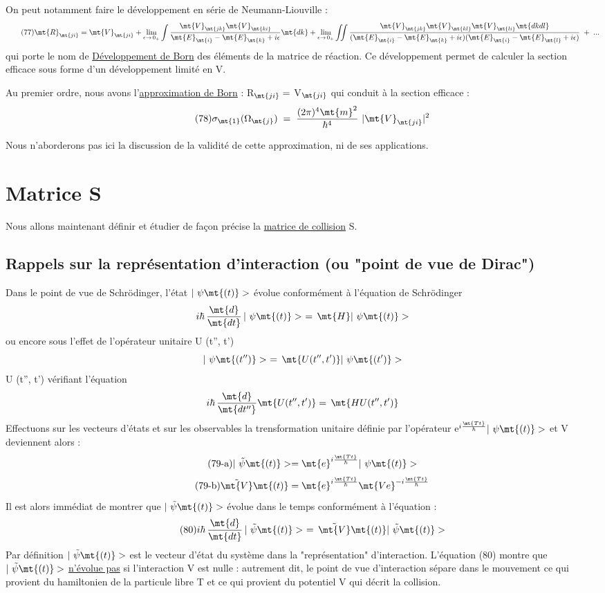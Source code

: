 On peut notamment faire le développement en série de Neumann-Liouville :
\[
\tag{77}\mt{R}_\mt{ji}=\mt{ V}_\mt{ji}+\lim_{\epsilon\to\,0_+}\int
\frac{\mt{V}_\mt{jk}\mt{ V}_\mt{ki}}{\mt{E}_\mt{i}-\mt{E}_\mt{k}+i\epsilon}\mt{ dk }+
\lim_{\epsilon\to\,0_+}\iint\frac{\mt{V}_\mt{jk}\mt{ V}_\mt{kl}\mt{ V}_\mt{li}\mt{ dk dl}}
{(\mt{E}_\mt{i}-\mt{E}_\mt{k}+i\epsilon)(\mt{E}_\mt{i}-\mt{E}_\mt{l}+i\epsilon)}\;+\;...
\]
qui porte le nom de \ul{Développement de Born} des éléments de la matrice de
réaction. Ce développement permet de calculer la section efficace sous
forme d'un développement limité en V.

Au premier ordre, nous avons l'\ul{approximation de Born} : R$_\mt{ji}=$ V$_\mt{ji}$
qui conduit à la section efficace :
\[
\tag{78}\sigma_\mt{1}(\Omega_\mt{j})\;=\;\frac{(2\pi)^4\mt{m}^2}{\hbar^4}\ |\mt{ V}_\mt{ji }|^2
\]

Nous n'aborderons pas ici la discussion de la validité de cette approximation,
ni de ses applications.
\section{Matrice S}%
Nous allons maintenant définir et étudier de façon précise
la \ul{matrice de collision} S.
\subsection{Rappels sur la représentation d'interaction (ou "point de vue de Dirac")}%
Dans le point de vue de Schrödinger, l'état $|\ \psi\mt{(t)}>$ évolue
conformément à l'équation de Schrödinger
\[
i\hbar\,\frac{\mt{d}}{\mt{dt}}\,|\ \psi\mt{(t)}>\ =\,\mt{H }|\ \psi\mt{(t)}>
\]
ou encore sous l'effet de l'opérateur unitaire U (t'', t')
\[
|\ \psi\mt{(t'')}>\ =\,\mt{U(t'', t') }|\ \psi\mt{(t')}>
\]
U (t'', t') vérifiant l'équation
\[
i\hbar\,\frac{\mt{d}}{\mt{dt''}}\mt{U(t'', t') }=\,\mt{H U(t'', t') }
\]
Effectuons sur les vecteurs d'états et sur les observables la trensformation
unitaire définie par l'opérateur e$^{i\frac{\mt{Tt}}{\hbar}}|\ \psi\mt{(t)}>$ et V deviennent
alors :
\[
\tag{79-a}|\ \tilde{\psi}\mt{(t)}>=\mt{e}^{i\frac{\mt{Tt}}{\hbar}}|\ \psi\mt{(t)}>
\]
\[
\tag{79-b}\tilde{\mt{V}}\mt{(t)}=\mt{e}^{i\frac{\mt{Tt}}{\hbar}}\mt{ V e}^{-i\frac{\mt{Tt}}{\hbar}}
\]
Il est alors immédiat de montrer que $|\ \tilde{\psi}\mt{(t)}>$ évolue dans le temps conformément
à l'équation :
\[
\tag{80}i\hbar\,\frac{\mt{d}}{\mt{dt}}\,|\ \tilde{\psi}\mt{(t)}>\ =\,\tilde{\mt{V}}\mt{(t) }|\ \tilde{\psi}\mt{(t)}>
\]
Par définition $|\ \tilde{\psi}\mt{(t)}>$ est le vecteur d'état du système dans
la "représentation" d'interaction. L'équation (80) montre que
$|\ \tilde{\psi}\mt{(t)}>$ \ul{n'évolue pas} si l'interaction V est nulle : autrement
dit, le point de vue d'interaction sépare dans le mouvement ce
qui provient du hamiltonien de la particule libre T et ce qui
provient du potentiel V qui décrit la collision.


